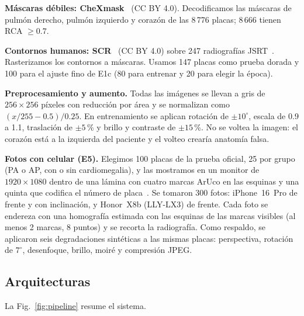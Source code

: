\documentclass[conference]{IEEEtran}
\begin{document}
\textbf{Máscaras débiles: CheXmask}~\cite{gaggion2024chexmask} (CC BY 4.0). Decodificamos las máscaras de pulmón
derecho, pulmón izquierdo y corazón de las 8\,776 placas; 8\,666 tienen RCA $\geq 0.7$.

\textbf{Contornos humanos: SCR}~\cite{vanginneken2006scr} (CC BY 4.0) sobre 247 radiografías JSRT~\cite{shiraishi2000jsrt}.
Rasterizamos los contornos a máscaras. Usamos 147 placas como prueba dorada y 100 para el ajuste fino de E1c (80 para
entrenar y 20 para elegir la época).

\textbf{Preprocesamiento y aumento.} Todas las imágenes se llevan a gris de $256\times256$ píxeles con reducción por
área y se normalizan como $(x/255-0.5)/0.25$. En entrenamiento se aplican rotación de $\pm10^\circ$, escala de 0.9 a
1.1, traslación de $\pm5$\,\% y brillo y contraste de $\pm15$\,\%. No se voltea la imagen: el corazón está a la
izquierda del paciente y el volteo crearía anatomía falsa.

\textbf{Fotos con celular (E5).} Elegimos 100 placas de la prueba oficial, 25 por grupo (PA o AP, con o sin
cardiomegalia), y las mostramos en un monitor de $1920\times1080$ dentro de una lámina con cuatro marcas ArUco en las
esquinas y una quinta que codifica el número de placa~\cite{garrido2014aruco}. Se tomaron 300 fotos: iPhone~16~Pro de
frente y con inclinación, y Honor~X8b (LLY-LX3) de frente. Cada foto se endereza con una homografía estimada con las
esquinas de las marcas visibles (al menos 2 marcas, 8 puntos) y se recorta la radiografía. Como respaldo, se aplicaron
seis degradaciones sintéticas a las mismas placas: perspectiva, rotación de $7^\circ$, desenfoque, brillo, moiré y
compresión JPEG.

\subsection{Arquitecturas}

La Fig.~\ref{fig:pipeline} resume el sistema.
\end{document}
